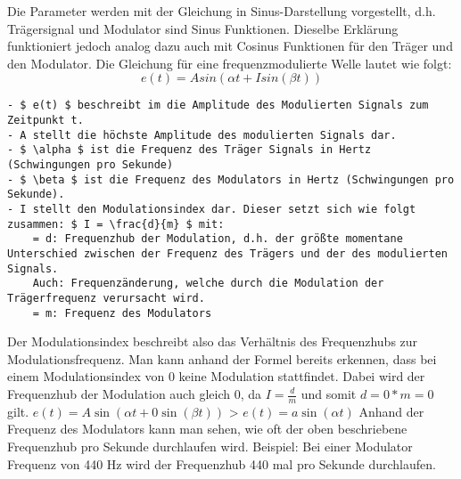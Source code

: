 Die Parameter werden mit der Gleichung in Sinus-Darstellung vorgestellt, d.h. Trägersignal und Modulator sind Sinus Funktionen. Dieselbe Erklärung funktioniert jedoch analog dazu auch mit Cosinus Funktionen für den Träger und den Modulator.
Die Gleichung für eine frequenzmodulierte Welle lautet wie folgt:
\[ e(t) = A sin(\alpha t + I sin(\beta t)) \]

\begin{lstlisting}[mathescape]
- $ e(t) $ beschreibt im die Amplitude des Modulierten Signals zum Zeitpunkt t.
- A stellt die höchste Amplitude des modulierten Signals dar. 
- $ \alpha $ ist die Frequenz des Träger Signals in Hertz (Schwingungen pro Sekunde)
- $ \beta $ ist die Frequenz des Modulators in Hertz (Schwingungen pro Sekunde). 
- I stellt den Modulationsindex dar. Dieser setzt sich wie folgt zusammen: $ I = \frac{d}{m} $ mit:
	= d: Frequenzhub der Modulation, d.h. der größte momentane Unterschied zwischen der Frequenz des Trägers und der des modulierten Signals.
	Auch: Frequenzänderung, welche durch die Modulation der Trägerfrequenz verursacht wird.
	= m: Frequenz des Modulators
\end{lstlisting}

Der Modulationsindex beschreibt also das Verhältnis des Frequenzhubs zur Modulationsfrequenz.
Man kann anhand der Formel bereits erkennen, dass bei einem Modulationsindex von 0 keine Modulation stattfindet. Dabei wird der Frequenzhub der Modulation auch gleich 0, da $ I=\frac{d}{m} $ und somit $ d = 0*m = 0 $ gilt. 
$ e(t) = A \sin(\alpha t + 0 \sin(\beta t)) $ > $ e(t) = a \sin(\alpha t) $
Anhand der Frequenz des Modulators kann man sehen, wie oft der oben beschriebene Frequenzhub pro Sekunde durchlaufen wird. Beispiel: Bei einer Modulator Frequenz von 440 Hz wird der Frequenzhub 440 mal pro Sekunde durchlaufen.
